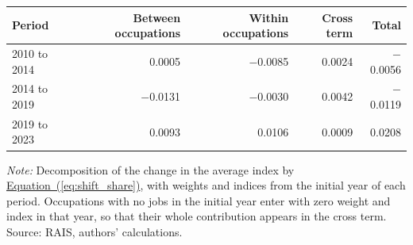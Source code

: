 {\small
\begin{threeparttable}
\begin{tabular}{lrrrr}
\toprule
Period & Between occupations & Within occupations & Cross term & Total \\
\midrule
2010 to 2014 & 0.0005 & $-$0.0085 & 0.0024 & $-$0.0056 \\
2014 to 2019 & $-$0.0131 & $-$0.0030 & 0.0042 & $-$0.0119 \\
2019 to 2023 & 0.0093 & 0.0106 & 0.0009 & 0.0208 \\
\bottomrule
\end{tabular}
\begin{tablenotes}[flushleft]\footnotesize
\item \textit{Note:} Decomposition of the change in the average index by \hyperref[eq:shift_share]{Equation~(\ref*{eq:shift_share})}, with weights and indices from the initial year of each period. Occupations with no jobs in the initial year enter with zero weight and index in that year, so that their whole contribution appears in the cross term. Source: RAIS, authors' calculations.
\end{tablenotes}
\end{threeparttable}
}
